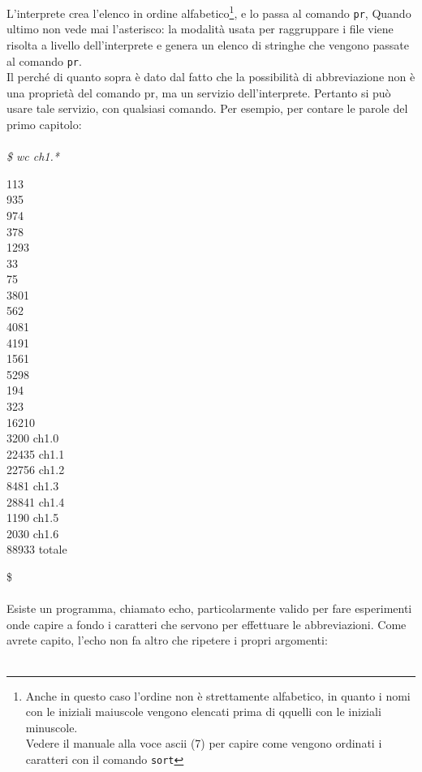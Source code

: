L'interprete crea l'elenco in ordine alfabetico\footnote{Anche in questo caso
l'ordine non è strettamente alfabetico, in quanto i nomi con le iniziali
maiuscole vengono elencati prima di qquelli con le iniziali minuscole.\\ Vedere
il manuale alla voce ascii (7) per capire come vengono ordinati i caratteri con
il comando \texttt{sort}}, e lo passa al comando \texttt{pr}, Quando ultimo non
vede mai l'asterisco: la modalità usata per raggruppare i file viene risolta a
livello dell'interprete e genera un elenco di stringhe che vengono passate al
comando \texttt{pr}.\\
Il perché di quanto sopra è dato dal fatto che la possibilità di abbreviazione non è una proprietà del comando pr, ma un servizio dell'interprete. Pertanto si può usare tale servizio, con qualsiasi comando. Per esempio, per contare le parole del primo capitolo:\\\\
{\it \$ wc ch1.*}
\begin{multicols}{3}
	113\\ 935\\ 974\\ 378\\ 1293\\ 33\\ 75\\ 3801\\ 562\\
	4081\\ 4191\\ 1561\\ 5298\\ 194\\ 323\\ 16210\\ 
	3200 ch1.0\\ 22435 ch1.1\\ 22756 ch1.2\\ 8481 ch1.3\\
	28841 ch1.4\\ 1190 ch1.5\\ 2030 ch1.6\\ 88933 totale
\end{multicols}
\$\\\\
Esiste un programma, chiamato echo, particolarmente valido per fare esperimenti
onde capire a fondo i caratteri che servono per effettuare le abbreviazioni. Come
avrete capito, l'echo non fa altro che ripetere i propri argomenti:\\\\
